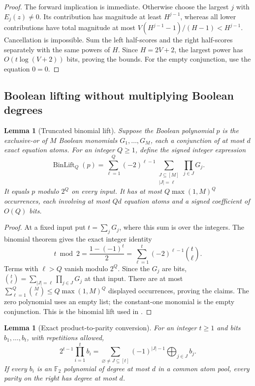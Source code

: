 \documentclass[11pt,letterpaper]{article}
\newtheorem{lemma}[theorem]{Lemma}
\theoremstyle{definition}
\theoremstyle{remark}
\begin{document}
\begin{proof}
The forward implication is immediate.  Otherwise choose the largest $j$
with $E_j(z)\ne0$.  Its contribution has magnitude at least $H^{j-1}$,
whereas all lower contributions have total magnitude at most
$V(H^{j-1}-1)/(H-1)<H^{j-1}$.  Cancellation is impossible.
Sum the left half-scores and the right half-scores separately with the
same powers of $H$.  Since $H=2V+2$, the largest power has
$O(t\log(V+2))$ bits, proving the bounds.  For the empty conjunction,
use the equation $0=0$.
\end{proof}

\subsection{Boolean lifting without multiplying Boolean degrees}

\begin{lemma}[Truncated binomial lift]
\label{alg:binlift}
Suppose the Boolean polynomial $p$ is the exclusive-or of $M$ Boolean
monomials $G_1,\ldots,G_M$, each a conjunction of at most $d$ exact
equation atoms.  For an integer $Q\ge1$, define the signed integer expression
\[
 \operatorname{BinLift}_Q(p)=
 \sum_{\ell=1}^{Q}(-2)^{\ell-1}
 \sum_{\substack{J\subseteq[M]\\|J|=\ell}}\prod_{j\in J}G_j.
\]
It equals $p$ modulo $2^Q$ on every input.  It has at most
$Q\max(1,M)^Q$ occurrences, each involving at most $Qd$ equation atoms
and a signed coefficient of $O(Q)$ bits.
\end{lemma}

\begin{proof}
At a fixed input put $t=\sum_jG_j$, where this sum is over the integers.
The binomial theorem gives the exact integer identity
\[
 t\bmod2=\frac{1-(-1)^t}{2}
 =\sum_{\ell=1}^{t}(-2)^{\ell-1}\binom t\ell.
\]
Terms with $\ell>Q$ vanish modulo $2^Q$.  Since the $G_j$ are bits,
$\binom t\ell=\sum_{|J|=\ell}\prod_{j\in J}G_j$ at that input.
There are at most $\sum_{\ell=1}^Q\binom M\ell\le Q\max(1,M)^Q$
displayed occurrences, proving the claims.  The zero polynomial uses an
empty list; the constant-one monomial is the empty conjunction.
This is the binomial lift used in \cite[Appendix~A.12]{NagCubic}.
\end{proof}

\begin{lemma}[Exact product-to-parity conversion]
\label{alg:polarization}
For an integer $t\ge1$ and bits $b_1,\ldots,b_t$, with repetitions
allowed,
\[
 2^{t-1}\prod_{i=1}^t b_i
 =\sum_{\varnothing\ne J\subseteq[t]}
       (-1)^{|J|-1}\bigoplus_{j\in J}b_j.
\]
If every $b_i$ is an $\mathbb F_2$ polynomial of degree at most $d$
in a common atom pool, every parity on the right has degree at most $d$.
\end{lemma}
\end{document}
